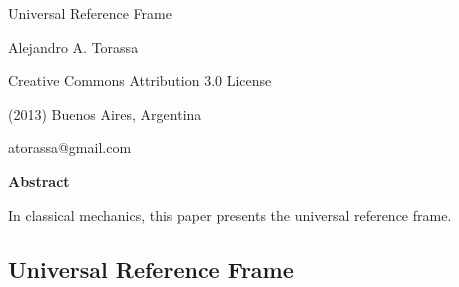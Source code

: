 \documentclass[10pt]{article}
\begin{document}
\begin{center}

{\huge Universal Reference Frame}

\bigskip \bigskip

{\large Alejandro A. Torassa}

\bigskip \bigskip

\small

Creative Commons Attribution 3.0 License

(2013) Buenos Aires, Argentina

atorassa@gmail.com

\bigskip \medskip

{\bf Abstract}

\bigskip

In classical mechanics, this paper presents the universal reference frame.

\end{center}

\normalsize

\vspace{-0.30em}

{\centering\subsection*{Universal Reference Frame}}

\vspace{+1.20em}
\end{document}

